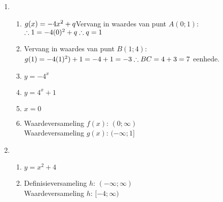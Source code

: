 {\begin{multicols}{3}
\begin{enumerate}[noitemsep, label=\textbf{\arabic*}. ]
\item %


 \begin{enumerate}[noitemsep, label=\textbf{(\alph*)} ]
\item $g(x) = -4x^2 + q\\
$Vervang in waardes van punt $A(0;1)$:\\
$\therefore 1 = -4(0)^2 + q\\
\therefore q=1$%
\item Vervang in waardes van punt $B(1;4)$:\\
$g(1) = -4(1)^2) + 1\\
=-4+1\\
=-3\\
\therefore BC = 4+3 = 7$ eenhede.
\item $y=-4^{x}$%
\item $y=4^{x}+1$%
\item $x=0$%
\item Waardeversameling $f(x)$: $(0;\infty)$\\
      Waardeversameling $g(x)$: $(-\infty;1]$
\end{enumerate}

\item %
 \begin{enumerate}[noitemsep, label=\textbf{(\alph*)} ]
      \setcounter{enumii_saved}{\value{enumii}}
\setcounter{enumii}{1}
\item $y=x^2+4$%
\item Definisieversameling $h$: $(-\infty;\infty)$\\
      Waardeversameling $h$: $[-4;\infty)$%
\end{enumerate}


\end{enumerate}
\end{multicols}}
